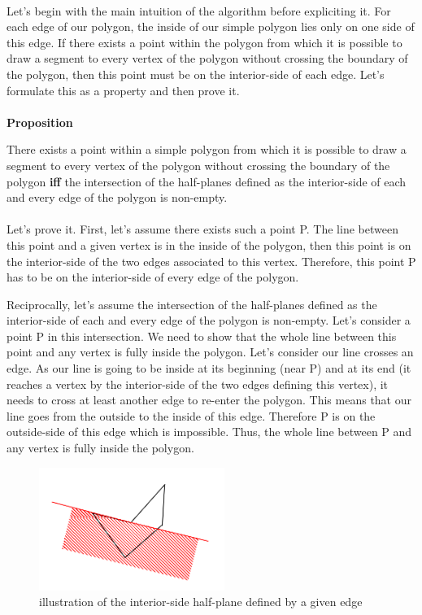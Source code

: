 \paragraph{}
Let's begin with the main intuition of the algorithm before expliciting it. For each edge of our polygon, the inside of our simple polygon lies only on one side of this edge. If there exists a point within the polygon from which it is possible to draw a segment to every vertex of the polygon without crossing the boundary of the polygon, then this point must be on the interior-side of each edge. Let's formulate this as a property and then prove it.

\paragraph{}
\textbf{Proposition}

There exists a point within a simple polygon from which it is possible to draw a segment to every vertex of the polygon without crossing the boundary of the polygon \textbf{iff} the intersection of the half-planes defined as the interior-side of each and every edge of the polygon is non-empty.

\paragraph{}
Let's prove it. First, let's assume there exists such a point P. The line between this point and a given vertex is in the inside of the polygon, then this point is on the interior-side of the two edges associated to this vertex. Therefore, this point P has to be on the interior-side of every edge of the polygon.

Reciprocally, let's assume the intersection of the half-planes defined as the interior-side of each and every edge of the polygon is non-empty. Let's consider a point P in this intersection. We need to show that the whole line between this point and any vertex is fully inside the polygon.
Let's consider our line crosses an edge. As our line is going to be inside at its beginning (near P) and at its end (it reaches a vertex by the interior-side of the two edges defining this vertex), it needs to cross at least another edge to re-enter the polygon. This means that our line goes from the outside to the inside of this edge. Therefore P is on the outside-side of this edge which is impossible. Thus, the whole line between P and any vertex is fully inside the polygon.

\begin{figure}[H]
\begin{center}
   \includegraphics[height=4cm]{fig1.png}
	\caption{illustration of the interior-side half-plane defined by a given edge}
	\label{plot}
	\end{center}
\end{figure}


